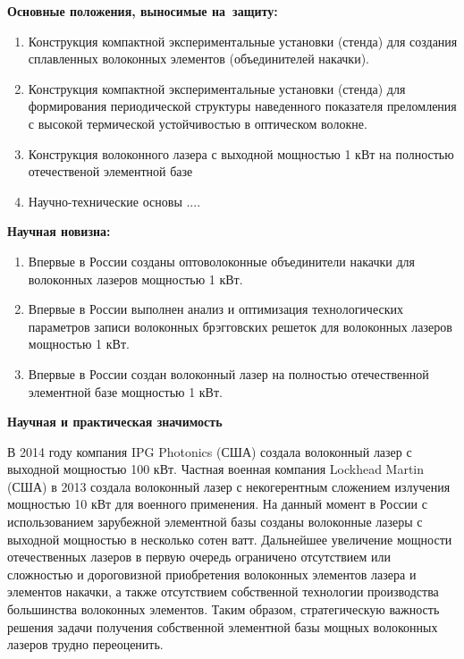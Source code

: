 \textbf{Основные положения, выносимые на~защиту:}
\begin{enumerate}
  \item Конструкция компактной экспериментальные установки (стенда) для создания сплавленных волоконных элементов (объединителей накачки).
  \item Конструкция компактной экспериментальные установки (стенда) для формирования периодической структуры наведенного показателя преломления с высокой термической устойчивостью в оптическом волокне.
  \item Конструкция волоконного лазера с выходной мощностью 1 кВт на полностью отечественой элементной базе
  \item Научно-технические основы ....
\end{enumerate}

\textbf{Научная новизна:}
\begin{enumerate}
  \item Впервые в России созданы оптоволоконные объединители накачки для волоконных лазеров мощностью 1 кВт.
  \item Впервые в России выполнен анализ и оптимизация технологических параметров записи волоконных брэгговских решеток для волоконных лазеров мощностью 1 кВт.
  \item Впервые в России создан волоконный лазер на полностью отечественной элементной базе мощностью 1 кВт.
\end{enumerate}

\textbf{Научная и практическая значимость}

В 2014 году компания IPG Photonics (США) создала волоконный лазер с выходной мощностью 100 кВт. Частная военная компания Lockhead Martin (США) в 2013 создала волоконный лазер с некогерентным сложением излучения мощностью 10 кВт для военного применения. На данный момент в России с использованием зарубежной элементной базы созданы волоконные лазеры с выходной мощностью в несколько сотен ватт. Дальнейшее увеличение мощности отечественных лазеров в первую очередь ограничено отсутствием или сложностью и дороговизной приобретения волоконных элементов лазера и элементов накачки, а также отсутствием собственной технологии производства большинства волоконных элементов. Таким образом, стратегическую важность решения задачи получения собственной элементной базы мощных волоконных лазеров трудно переоценить.

